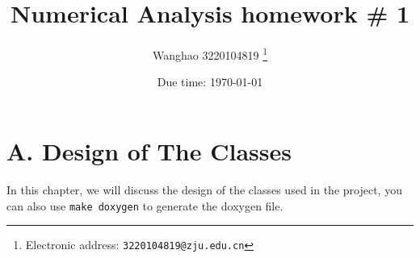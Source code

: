 \documentclass[a4paper]{article}
\begin{document}
\title{Numerical Analysis homework \# 1}

\author{Wanghao 3220104819
  \thanks{Electronic address: \texttt{3220104819@zju.edu.cn}}}


\date{Due time: \today}

\maketitle

\section*{A. Design of The Classes}

In this chapter, we will discuss the design of the classes used in the project, you can also use \texttt{make doxygen} to generate the doxygen file. 
\end{document}
